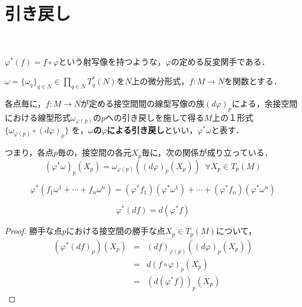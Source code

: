 \documentclass[uplatex, dvipdfmx]{jsreport}
\begin{document}
\section{引き戻し}

\begin{definition}[関数の引き戻し]　

    \begin{center}
    \end{center}

    $\varphi^*(f)=f\circ \varphi$という射写像を持つような，$\varphi$の定める反変関手である．
\end{definition}

\begin{definition}[１形式の引き戻し]
    $\omega=\{\omega_q\}_{q\in N}\in\prod_{q\in N}T_q^*(N)$を$N$上の微分形式，$f:M\to N$を関数とする．

    各点毎に，$f:M\to N$が定める接空間間の線型写像の族$(d\varphi)_p$による，余接空間における線型形式$\omega_{\varphi(p)}$の$p$への引き戻しを施して得る$M$上の１形式$\{\omega_{\varphi(p)}\circ (d\varphi)_p\}$
    を，\textbf{$\omega$の$\varphi$による引き戻し}といい，$\varphi^*\omega$と表す．
\end{definition}
\begin{corollary}
    つまり，各点$p$毎の，接空間の各元$X_p$毎に，次の関係が成り立っている．
    \[ (\varphi^*\omega)_p(X_p)=\omega_{\varphi(p)}((d\varphi)_p(X_p))\;\; \forall X_p\in T_p(M) \]
\end{corollary}

\begin{proposition}
    \[ \varphi^*(f_1\omega^1+\cdots+f_n\omega^n)=(\varphi^*f_1)(\varphi^*\omega^1)+\cdots+(\varphi^*f_n)(\varphi^*\omega^n) \]
\end{proposition}

\begin{proposition}[pullbackの真実！]
    \[\varphi^*(df)=d(\varphi^*f)\]
\end{proposition}
\begin{proof}
    勝手な点$p$における接空間の勝手な点$X_p\in T_p(M)$について，
    \begin{eqnarray*}
        (\varphi^*(df)_p)(X_p)&=& (df)_{\varphi(p)}((d\varphi)_p(X_p)) \\
        &=& d(f\circ\varphi)_p(X_p)\\
        &=& (d(\varphi^*f))_p(X_p)
    \end{eqnarray*}
\end{proof}
\end{document}
